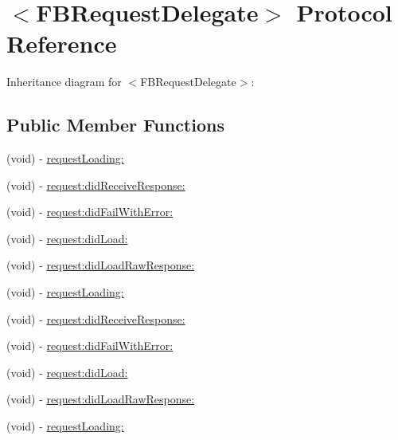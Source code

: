 \hypertarget{protocol_f_b_request_delegate-p}{
\section{$<$\-F\-B\-Request\-Delegate$>$ \-Protocol \-Reference}
\label{protocol_f_b_request_delegate-p}
}


\-Inheritance diagram for $<$\-F\-B\-Request\-Delegate$>$\-:
\subsection*{\-Public \-Member \-Functions}
\begin{DoxyCompactItemize}
\item 
(void) -\/ \hyperlink{protocol_f_b_request_delegate-p_ad1af69a59feb2ba71fe590006a8a171e}{request\-Loading\-:}
\item 
(void) -\/ \hyperlink{protocol_f_b_request_delegate-p_a8cde5cc6c16a5741620eef28bcbb49de}{request\-:did\-Receive\-Response\-:}
\item 
(void) -\/ \hyperlink{protocol_f_b_request_delegate-p_a72b496882171f6660300025f5c82201b}{request\-:did\-Fail\-With\-Error\-:}
\item 
(void) -\/ \hyperlink{protocol_f_b_request_delegate-p_a26994e26be1a1414f82a5cf92d1b3865}{request\-:did\-Load\-:}
\item 
(void) -\/ \hyperlink{protocol_f_b_request_delegate-p_a4941d7fd8fda538fec9b1dcef54cb9ac}{request\-:did\-Load\-Raw\-Response\-:}
\item 
(void) -\/ \hyperlink{protocol_f_b_request_delegate-p_ad1af69a59feb2ba71fe590006a8a171e}{request\-Loading\-:}
\item 
(void) -\/ \hyperlink{protocol_f_b_request_delegate-p_a8cde5cc6c16a5741620eef28bcbb49de}{request\-:did\-Receive\-Response\-:}
\item 
(void) -\/ \hyperlink{protocol_f_b_request_delegate-p_a72b496882171f6660300025f5c82201b}{request\-:did\-Fail\-With\-Error\-:}
\item 
(void) -\/ \hyperlink{protocol_f_b_request_delegate-p_a26994e26be1a1414f82a5cf92d1b3865}{request\-:did\-Load\-:}
\item 
(void) -\/ \hyperlink{protocol_f_b_request_delegate-p_a4941d7fd8fda538fec9b1dcef54cb9ac}{request\-:did\-Load\-Raw\-Response\-:}
\item 
(void) -\/ \hyperlink{protocol_f_b_request_delegate-p_ad1af69a59feb2ba71fe590006a8a171e}{request\-Loading\-:}
\item 

\end{DoxyCompactItemize}

